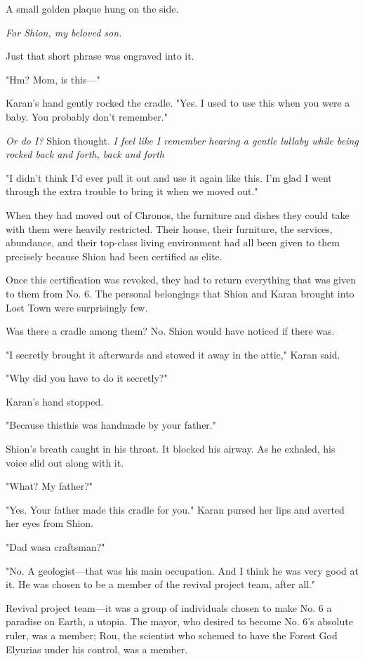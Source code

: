 A small golden plaque hung on the side.

\emph{For Shion, my beloved son.}

Just that short phrase was engraved into it.

"Hm? Mom, is this---"

Karan's hand gently rocked the cradle. "Yes. I used to use this when you
were a baby. You probably don't remember."

\emph{Or do I?} Shion thought. \emph{I feel like I remember hearing a gentle
lullaby while being rocked back and forth, back and forth\el }

"I didn't think I'd ever pull it out and use it again like this. I'm
glad I went through the extra trouble to bring it when we moved out."

When they had moved out of Chronos, the furniture and dishes they could
take with them were heavily restricted. Their house, their furniture,
the services, abundance, and their top-class living environment had all
been given to them precisely because Shion had been certified as elite.

Once this certification was revoked, they had to return everything that
was given to them from No. 6. The personal belongings that Shion and
Karan brought into Lost Town were surprisingly few.

Was there a cradle among them? No. Shion would have noticed if there
was.

"I secretly brought it afterwards and stowed it away in the attic,"
Karan said.

"Why did you have to do it secretly?"

Karan's hand stopped.

"Because this\el this was handmade by your father."

Shion's breath caught in his throat. It blocked his airway. As he
exhaled, his voice slid out along with it.

"What? My father?"

"Yes. Your father made this cradle for you." Karan pursed her lips and
averted her eyes from Shion.

"Dad was\el a craftsman?"

"No. A geologist---that was his main occupation. And I think he was very
good at it. He was chosen to be a member of the revival project team,
after all."

Revival project team---it was a group of individuals chosen to make No. 6
a paradise on Earth, a utopia. The mayor, who desired to become No. 6's
absolute ruler, was a member; Rou, the scientist who schemed to have the
Forest God Elyurias under his control, was a member.

